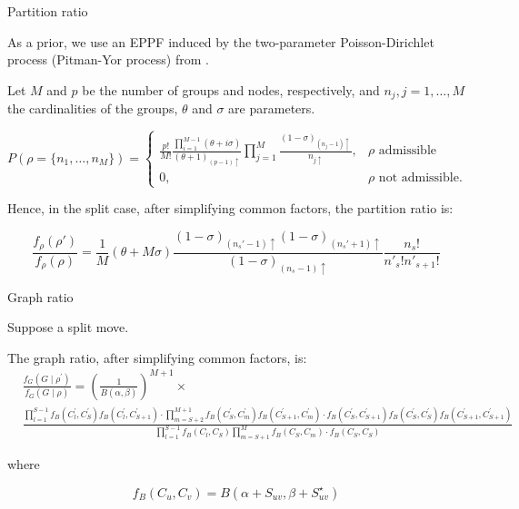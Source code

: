 \begin{frame}{Partition ratio}

As a prior, we use an EPPF induced by the \alert{two-parameter Poisson-Dirichlet} process (Pitman-Yor process) from \cite{martinezNonparametricChangePoint2014}.

Let $M$ and $p$ be the number of groups and nodes, respectively, and $n_{j},j=1,\ldots,M$ the cardinalities of the groups, $\theta$ and $\sigma$ are parameters.

\begin{equation*}
    P(\rho = \{n_1, \ldots, n_M\})
    =
    \begin{cases}
        \frac{p!}{M!} \frac{ \prod_{i=1}^{M-1}{(\theta +i\sigma)} }{(\theta+1)_{(p-1)\uparrow}} \prod_{j=1}^{M}{\frac{(1-\sigma)_{(n_{j}-1)\uparrow}}{n_{j\uparrow}} }, & \rho \text{ admissible} \\
        0, & \rho \text{ not admissible.}
    \end{cases}
\end{equation*}

Hence, in the split case, after simplifying common factors, the \alert{partition ratio} is:

\begin{equation*}
    \frac{f_{\rho}(\rho')}{f_{\rho}(\rho)}
    =
    \frac{1}{M}(\theta+M\sigma)\frac{(1-\sigma)_{(n_{s}'-1)\uparrow}(1-\sigma)_{(n_{s}'+1)\uparrow}}{(1-\sigma)_{(n_{s}-1)\uparrow}}\frac{n_{s}!}{n'_{s}!n'_{s+1}!}
\end{equation*}

\end{frame}

\begin{frame}{Graph ratio}

Suppose a split move.

The \alert{graph ratio}, after simplifying common factors, is:
{
    \footnotesize
    \begin{align*}
        & \frac{f_G(G \mid \rho^\prime)}{f_G(G \mid \rho)}=\left(\frac{1}{B(\alpha, \beta)}\right)^{M+1} \times \\
        & \frac{ \prod_{l=1}^{S-1} f_B(C_l^\prime, C_S^\prime) f_B(C_l^\prime, C_{S+1}^\prime) \cdot \prod_{m=S+2}^{M+1} f_B(C_S^\prime, C_m^\prime) f_B(C_{S+1}^\prime, C_m^\prime) \cdot f_B(C_S^\prime, C_{S+1}^\prime) f_B(C_S^\prime, C_S^\prime) f_B(C_{S+1}^\prime, C_{S+1}^\prime)}{\prod_{l=1}^{S-1} f_B(C_l, C_S) \prod_{m=S+1}^M f_B(C_S, C_m) \cdot f_B(C_S, C_S)}
    \end{align*}
}

where

\[
    f_B(C_u, C_v) = B(\alpha+S_{uv},\beta+S^{\star}_{uv})
\]

\end{frame}
